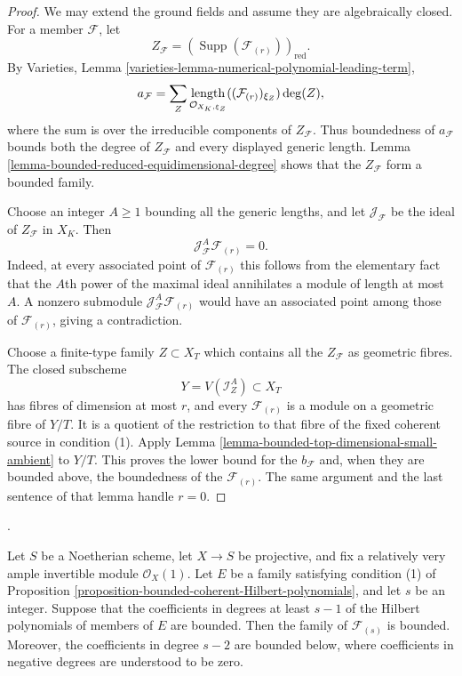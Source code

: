 \begin{proof}
We may extend the ground fields and assume they are algebraically closed.
For a member $\mathcal{F}$, let
$$
Z_{\mathcal{F}}=
(\operatorname{Supp}(\mathcal{F}_{(r)}))_{\mathrm{red}}.
$$
By Varieties, Lemma
\ref{varieties-lemma-numerical-polynomial-leading-term},
$$
a_{\mathcal{F}}=
\sum_Z
\mathop{\rm length}_{\mathcal{O}_{X_K,\xi_Z}}
((\mathcal{F}_{(r)})_{\xi_Z})\deg(Z),
$$
where the sum is over the irreducible components of $Z_{\mathcal{F}}$.
Thus boundedness of $a_{\mathcal{F}}$ bounds both the degree of
$Z_{\mathcal{F}}$ and every displayed generic length. Lemma
\ref{lemma-bounded-reduced-equidimensional-degree} shows that the
$Z_{\mathcal{F}}$ form a bounded family.

Choose an integer $A \geq 1$ bounding all the generic lengths, and let
$\mathcal{J}_{\mathcal{F}}$ be the ideal of $Z_{\mathcal{F}}$ in $X_K$.
Then
$$
\mathcal{J}_{\mathcal{F}}^A\mathcal{F}_{(r)}=0.
$$
Indeed, at every associated point of $\mathcal{F}_{(r)}$ this follows from
the elementary fact that the $A$th power of the maximal ideal annihilates a
module of length at most $A$. A nonzero submodule
$\mathcal{J}_{\mathcal{F}}^A\mathcal{F}_{(r)}$ would have an associated point
among those of $\mathcal{F}_{(r)}$, giving a contradiction.

Choose a finite-type family $Z\subset X_T$ which contains all the
$Z_{\mathcal{F}}$ as geometric fibres. The closed subscheme
$$
Y=V(\mathcal{I}_Z^A)\subset X_T
$$
has fibres of dimension at most $r$, and every $\mathcal{F}_{(r)}$ is a module
on a geometric fibre of $Y/T$. It is a quotient of the restriction to that
fibre of the fixed coherent source in condition (1). Apply Lemma
\ref{lemma-bounded-top-dimensional-small-ambient} to $Y/T$. This proves the
lower bound for the $b_{\mathcal{F}}$ and, when they are bounded above, the
boundedness of the $\mathcal{F}_{(r)}$. The same argument and the last
sentence of that lemma handle $r=0$.
\end{proof}

\begin{proposition}
\label{proposition-bounded-dimension-truncations}
\begin{reference}
\cite[Expos\'e 221, Theorem 2.2, pp. 254--258]{FGA}.
\end{reference}
Let $S$ be a Noetherian scheme, let $X\to S$ be projective, and fix a
relatively very ample invertible module $\mathcal{O}_X(1)$. Let $E$ be a
family satisfying condition (1) of Proposition
\ref{proposition-bounded-coherent-Hilbert-polynomials}, and let $s$ be an
integer. Suppose that the coefficients in degrees at least $s-1$ of the
Hilbert polynomials of members of $E$ are bounded. Then the family of
$\mathcal{F}_{(s)}$ is bounded. Moreover, the coefficients in degree $s-2$
are bounded below, where coefficients in negative degrees are understood to
be zero.
\end{proposition}

